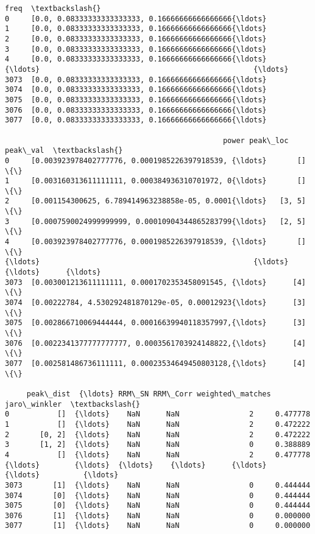 \documentclass[11pt]{article}
\begin{document}
\begin{tcolorbox}[breakable, size=fbox, boxrule=.5pt, pad at break*=1mm, opacityfill=0]
\begin{Verbatim}[commandchars=\\\{\}]
                                                   freq  \textbackslash{}
0     [0.0, 0.08333333333333333, 0.16666666666666666{\ldots}
1     [0.0, 0.08333333333333333, 0.16666666666666666{\ldots}
2     [0.0, 0.08333333333333333, 0.16666666666666666{\ldots}
3     [0.0, 0.08333333333333333, 0.16666666666666666{\ldots}
4     [0.0, 0.08333333333333333, 0.16666666666666666{\ldots}
{\ldots}                                                 {\ldots}
3073  [0.0, 0.08333333333333333, 0.16666666666666666{\ldots}
3074  [0.0, 0.08333333333333333, 0.16666666666666666{\ldots}
3075  [0.0, 0.08333333333333333, 0.16666666666666666{\ldots}
3076  [0.0, 0.08333333333333333, 0.16666666666666666{\ldots}
3077  [0.0, 0.08333333333333333, 0.16666666666666666{\ldots}

                                                  power peak\_loc peak\_val  \textbackslash{}
0     [0.003923978402777776, 0.0001985226397918539, {\ldots}       []       \{\}
1     [0.003160313611111111, 0.000384936310701972, 0{\ldots}       []       \{\}
2     [0.001154300625, 6.789414963238858e-05, 0.0001{\ldots}   [3, 5]       \{\}
3     [0.0007590024999999999, 0.00010904344865283799{\ldots}   [2, 5]       \{\}
4     [0.003923978402777776, 0.0001985226397918539, {\ldots}       []       \{\}
{\ldots}                                                 {\ldots}      {\ldots}      {\ldots}
3073  [0.003001213611111111, 0.0001702353458091545, {\ldots}      [4]       \{\}
3074  [0.00222784, 4.530292481870129e-05, 0.00012923{\ldots}      [3]       \{\}
3075  [0.002866710069444444, 0.00016639940118357997,{\ldots}      [3]       \{\}
3076  [0.0022341377777777777, 0.0003561703924148822,{\ldots}      [4]       \{\}
3077  [0.002581486736111111, 0.00023534649450803128,{\ldots}      [4]       \{\}

     peak\_dist  {\ldots} RRM\_SN RRM\_Corr weighted\_matches jaro\_winkler  \textbackslash{}
0           []  {\ldots}    NaN      NaN                2     0.477778
1           []  {\ldots}    NaN      NaN                2     0.472222
2       [0, 2]  {\ldots}    NaN      NaN                2     0.472222
3       [1, 2]  {\ldots}    NaN      NaN                0     0.388889
4           []  {\ldots}    NaN      NaN                2     0.477778
{\ldots}        {\ldots}  {\ldots}    {\ldots}      {\ldots}              {\ldots}          {\ldots}
3073       [1]  {\ldots}    NaN      NaN                0     0.444444
3074       [0]  {\ldots}    NaN      NaN                0     0.444444
3075       [0]  {\ldots}    NaN      NaN                0     0.444444
3076       [1]  {\ldots}    NaN      NaN                0     0.000000
3077       [1]  {\ldots}    NaN      NaN                0     0.000000


\end{Verbatim}
\end{tcolorbox}
\end{document}
